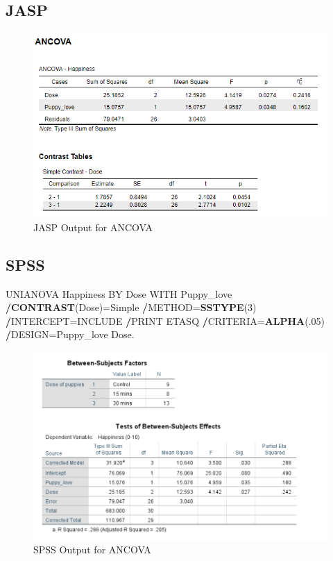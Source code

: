 \documentclass[
]{book}
\newenvironment{Shaded}{\begin{snugshade}}{\end{snugshade}}
\newcommand{\DecValTok}[1]{\textcolor[rgb]{0.00,0.00,0.81}{#1}}
\newcommand{\KeywordTok}[1]{\textcolor[rgb]{0.13,0.29,0.53}{\textbf{#1}}}
\newcommand{\NormalTok}[1]{#1}
\newcommand{\OperatorTok}[1]{\textcolor[rgb]{0.81,0.36,0.00}{\textbf{#1}}}
\begin{document}
\hypertarget{jasp-5}{%
\subsection{JASP}\label{jasp-5}}

\begin{figure}[!h]
\includegraphics{Screenshots/ANCOVA/ancovaJASP} \caption{\label{fig:ancovaJASP}JASP Output for ANCOVA}\label{fig:ancovaJASP}
\end{figure}

\hypertarget{spss-5}{%
\subsection{SPSS}\label{spss-5}}

\begin{Shaded}
\begin{Highlighting}[]
\NormalTok{UNIANOVA Happiness BY Dose WITH Puppy_love}
  \OperatorTok{/}\KeywordTok{CONTRAST}\NormalTok{(Dose)=Simple}
  \OperatorTok{/}\NormalTok{METHOD=}\KeywordTok{SSTYPE}\NormalTok{(}\DecValTok{3}\NormalTok{)}
  \OperatorTok{/}\NormalTok{INTERCEPT=INCLUDE}
  \OperatorTok{/}\NormalTok{PRINT ETASQ}
  \OperatorTok{/}\NormalTok{CRITERIA=}\KeywordTok{ALPHA}\NormalTok{(.}\DecValTok{05}\NormalTok{)}
  \OperatorTok{/}\NormalTok{DESIGN=Puppy_love Dose.}
\end{Highlighting}
\end{Shaded}

\begin{figure}[!h]
\includegraphics{Screenshots/ANCOVA/ancovaSPSS} \caption{\label{fig:ancovaSPSS}SPSS Output for ANCOVA}\label{fig:ancovaSPSS}
\end{figure}
\end{document}
